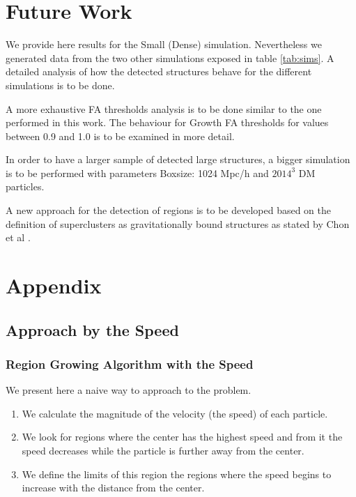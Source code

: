 \documentclass[12pt]{article}
\begin{document}
\section{Future Work}
\label{sec:future_work}
\begin{par}
We provide here results for the Small (Dense)
 simulation. Nevertheless we generated data from
  the two other simulations exposed in table
   \ref{tab:sims}. A detailed analysis of how the
    detected structures behave for the different
     simulations is to be done.\\
\end{par}
\begin{par}
A more exhaustive FA thresholds analysis is to be
 done similar to the one performed in this work.
  The behaviour for Growth FA thresholds for values
   between 0.9 and 1.0 is to be examined in more
    detail.
\end{par}
\begin{par}
In order to have a larger sample of detected large
 structures, a bigger simulation is to be performed
  with parameters Boxsize: 1024 Mpc/h and $2014^3$
   DM particles. \\
\end{par}
\begin{par}
A new approach for the detection of regions is to
 be developed based on the definition of
  superclusters as gravitationally bound structures
   as stated by Chon et al
    \cite{chon_definition_2015}.
\end{par}






\appendix
\section{Appendix}
\subsection{Approach by the Speed} 
\label{App:App_Speed}
\subsubsection{Region Growing Algorithm with the Speed}

We present here a naive way to approach to the problem. 
\begin{enumerate}
	\item We calculate the magnitude of the velocity (the speed) of each particle. 
	\item We look for regions where the center has the highest speed and from it the speed decreases while the particle is further away from the center. 
    \item We define the limits of this region the regions where the speed begins to increase with the distance from the center.
\end{enumerate}
\end{document}
